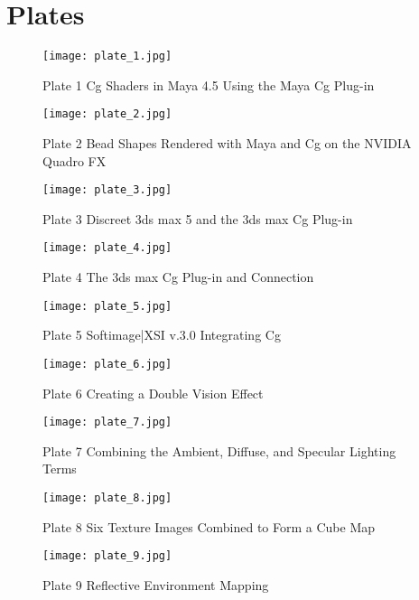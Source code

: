 \documentclass[../main.tex]{subfiles}
\begin{document}
\chapter*{Plates}

\FloatBarrier
\begin{figure}
    \centering
    \texttt{[image: plate\_1.jpg]}
    \caption{Plate 1 Cg Shaders in Maya 4.5 Using the Maya Cg Plug-in}
    \label{fig:plate-1}
\end{figure}
\FloatBarrier
\begin{figure}
    \centering
    \texttt{[image: plate\_2.jpg]}
    \caption{Plate 2 Bead Shapes Rendered with Maya and Cg on the NVIDIA Quadro FX}
    \label{fig:plate-2}
\end{figure}
\FloatBarrier
\begin{figure}
    \centering
    \texttt{[image: plate\_3.jpg]}
    \caption{Plate 3 Discreet 3ds max 5 and the 3ds max Cg Plug-in}
    \label{fig:plate-3}
\end{figure}
\FloatBarrier
\begin{figure}
    \centering
    \texttt{[image: plate\_4.jpg]}
    \caption{Plate 4 The 3ds max Cg Plug-in and Connection }
    \label{fig:plate-4}
\end{figure}
\FloatBarrier
\begin{figure}
    \centering
    \texttt{[image: plate\_5.jpg]}
    \caption{Plate 5 Softimage|XSI v.3.0 Integrating Cg}
    \label{fig:plate-5}
\end{figure}
\FloatBarrier
\begin{figure}
    \centering
    \texttt{[image: plate\_6.jpg]}
    \caption{Plate 6 Creating a Double Vision Effect}
    \label{fig:plate-6}
\end{figure}
\FloatBarrier
\begin{figure}
    \centering
    \texttt{[image: plate\_7.jpg]}
    \caption{Plate 7 Combining the Ambient, Diffuse, and Specular Lighting Terms}
    \label{fig:plate-7}
\end{figure}
\FloatBarrier
\begin{figure}
    \centering
    \texttt{[image: plate\_8.jpg]}
    \caption{Plate 8 Six Texture Images Combined to Form a Cube Map}
    \label{fig:plate-8}
\end{figure}
\FloatBarrier
\begin{figure}
    \centering
    \texttt{[image: plate\_9.jpg]}
    \caption{Plate 9 Reflective Environment Mapping}
    \label{fig:plate-9}
\end{figure}
\end{document}
